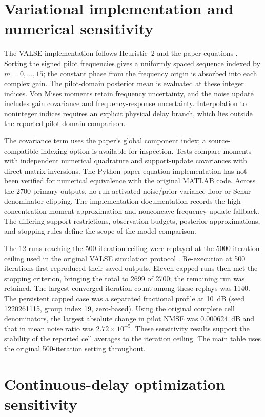 \appendix
\section{Variational implementation and numerical sensitivity}
\label{app:valse}

The VALSE implementation follows Heuristic~2 and the paper equations
\cite{badiu2017valse}. Sorting the signed pilot frequencies gives a uniformly
spaced sequence indexed by $m=0,\ldots,15$; the constant phase from the
frequency origin is absorbed into each complex gain. The pilot-domain
posterior mean is evaluated at these integer indices. Von Mises moments retain
frequency uncertainty, and the noise update includes gain covariance and
frequency-response uncertainty. Interpolation to noninteger indices requires
an explicit physical delay branch, which lies outside the reported pilot-domain
comparison.

The covariance term uses the paper's global component index; a
source-compatible indexing option is available for inspection. Tests compare
moments with independent numerical quadrature and support-update covariances
with direct matrix inversions. The Python paper-equation implementation has
not been verified for numerical equivalence with the original MATLAB code.
Across the 2700 primary outputs, no run activated noise/prior variance-floor
or Schur-denominator clipping. The implementation documentation records the
high-concentration moment approximation and nonconcave frequency-update
fallback. The differing support restrictions, observation budgets, posterior
approximations, and stopping rules define the scope of the model comparison.

The 12 runs reaching the 500-iteration ceiling were replayed at the
5000-iteration ceiling used in the original VALSE simulation protocol
\cite{badiu2017valse}. Re-execution at 500 iterations first reproduced their
saved outputs. Eleven capped runs then met the stopping criterion, bringing
the total to 2699 of 2700; the remaining run was retained. The largest
converged iteration count among these replays was 1140. The persistent capped
case was a separated fractional profile at 10~dB (seed 1220261115,
group index 19, zero-based).
Using the original complete cell denominators, the largest absolute change
in pilot NMSE was 0.000624~dB and that in mean noise ratio was
$2.72\times10^{-5}$. These sensitivity results support the stability of the
reported cell averages to the iteration ceiling. The main table uses the
original 500-iteration setting throughout.

\section{Continuous-delay optimization sensitivity}
\label{app:optimizer}

